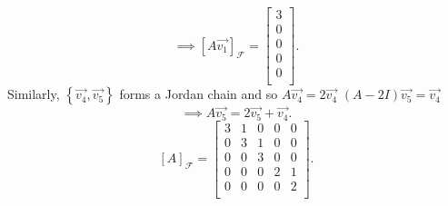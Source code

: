 \documentclass{report}
\begin{document}
{ \[
    \implies \left[ A  \vec{ v_1} \right] _{ \mathcal{F}} = \begin{bmatrix}
    3\\
    0\\
    0\\
    0\\
    0\\
    \end{bmatrix}
 .\] 
 Similarly, $ \left\{ \vec{ v_4} ,\vec{ v_5}  \right\} $ forms a Jordan chain and so $ A \vec{ v_4} = 2 \vec{ v_4} $ $ \left( A -2I \right) \vec{ v_5} = \vec{ v_4} $ \\
 \[
    \implies A \vec{ v_5} = 2 \vec{ v_5} + \vec{ v_4}
 .\] 
  \[
    \left[ A  \right] _{ \mathcal{F}} = \begin{bmatrix}
    3 & 1 & 0 & 0 & 0\\
    0 & 3 & 1 & 0 & 0\\
    0 & 0 & 3 & 0 & 0\\
    0 & 0 & 0 & 2 & 1\\
    0 & 0 & 0 & 0 & 2\\
    \end{bmatrix}
  .\] 
  
}

       






  
\end{document}
